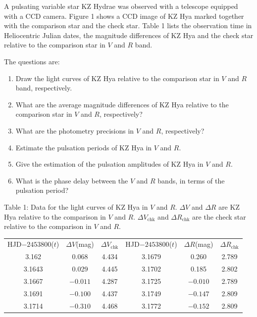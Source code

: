 A pulsating variable star KZ Hydrae was observed with a telescope equipped
with a CCD camera. Figure 1 shows a CCD image of KZ Hya marked together with
the comparison star and the check star. Table 1 lists the observation time in
Heliocentric Julian dates, the magnitude differences of KZ Hya and the check
star relative to the comparison star in $V$ and $R$ band.

The questions are:
\begin{enumerate}
\item Draw the light curves of KZ Hya relative to the comparison star in $V$
  and $R$ band, respectively.
\item What are the average magnitude differences of KZ Hya relative to the
  comparison star in $V$ and $R$, respectively?
\item What are the photometry precisions in $V$ and $R$, respectively?
\item Estimate the pulsation periods of KZ Hya in $V$ and $R$.
\item Give the estimation of the pulsation amplitudes of KZ Hya in $V$ and
  $R$.
\item What is the phase delay between the $V$ and $R$ bands, in terms of the
  pulsation period?
\end{enumerate}

Table 1: Data for the light curves of KZ Hya in $V$ and $R$. $\Delta V$ and
$\Delta R$ are KZ Hya relative to the comparison in $V$ and $R$.
$\Delta V_{\mathrm{chk}}$ and $\Delta R_{\mathrm{chk}}$ are the check star
relative to the comparison in $V$ and $R$.

\begin{center}
\begin{tabular}{cccccc}
HJD$-2453800$($t$) & $\Delta V$(mag) & $\Delta V_{\mathrm{chk}}$ &
HJD$-2453800$($t$) & $\Delta R$(mag) & $\Delta R_{\mathrm{chk}}$ \\
3.162 & 0.068 & 4.434 & 3.1679 & 0.260 & 2.789 \\
3.1643 & 0.029 & 4.445 & 3.1702 & 0.185 & 2.802 \\
3.1667 & $-0.011$ & 4.287 & 3.1725 & $-0.010$ & 2.789 \\
3.1691 & $-0.100$ & 4.437 & 3.1749 & $-0.147$ & 2.809 \\
3.1714 & $-0.310$ & 4.468 & 3.1772 & $-0.152$ & 2.809 \\
\end{tabular}
\end{center}

